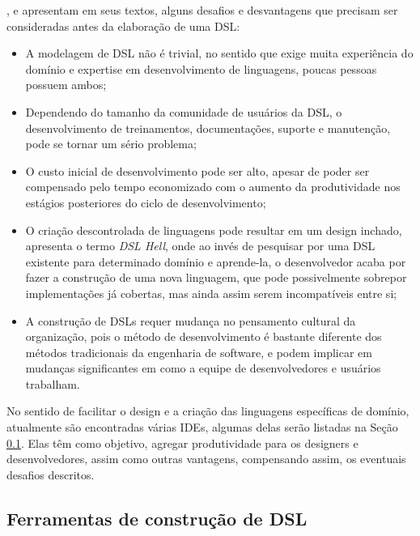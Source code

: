 ,  e  apresentam em seus textos, alguns desafios e desvantagens que precisam ser consideradas antes da elaboração de uma \gls{DSL}:

\begin{itemize}
    \item A modelagem de \gls{DSL} não é trivial, no sentido que exige muita experiência do domínio e expertise em desenvolvimento de linguagens, poucas pessoas possuem ambos;
    \item Dependendo do tamanho da comunidade de usuários da \gls{DSL}, o desenvolvimento de treinamentos, documentações, suporte e manutenção, pode se tornar um sério problema;
    \item O custo inicial de desenvolvimento pode ser alto, apesar de poder ser compensado pelo tempo economizado com o aumento da produtividade nos estágios posteriores do ciclo de desenvolvimento;
    \item O criação descontrolada de linguagens pode resultar em um design inchado,  apresenta o termo \textit{DSL Hell}, onde ao invés de pesquisar por uma \gls{DSL} existente para determinado domínio e aprende-la, o desenvolvedor acaba por fazer a construção de uma nova linguagem, que pode possivelmente sobrepor implementações já cobertas, mas ainda assim serem incompatíveis entre si;
    \item A construção de \gls{DSL}s requer mudança no pensamento cultural da organização, pois o método de desenvolvimento é bastante diferente dos métodos tradicionais da engenharia de software, e podem implicar em mudanças significantes em como a equipe de desenvolvedores e usuários trabalham.
    
\end{itemize}

No sentido de facilitar o design e a criação das linguagens específicas de domínio, atualmente são encontradas várias \gls{IDE}s, algumas delas serão listadas na Seção \ref{ferramentasdsl}. Elas têm como objetivo, agregar produtividade para os designers e desenvolvedores, assim como outras vantagens, compensando assim, os eventuais desafios descritos.


\newpage
\subsection{Ferramentas de construção de DSL}
\label{ferramentasdsl}



